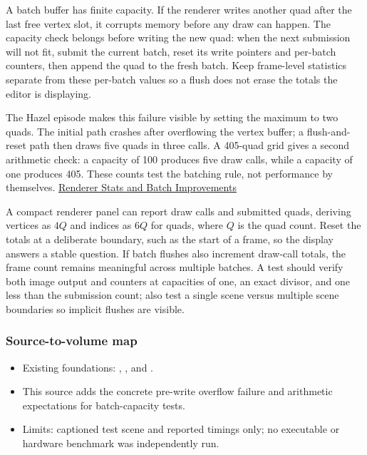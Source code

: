 \hypertarget{06-engine-ii-ch026-a-batch-limit-must-trigger-a-flush-before-the-next-quad-is-written}{}

A batch buffer has finite capacity. If the renderer writes another quad after the last free vertex slot, it corrupts memory before any draw can happen. The capacity check belongs before writing the new quad: when the next submission will not fit, submit the current batch, reset its write pointers and per-batch counters, then append the quad to the fresh batch. Keep frame-level statistics separate from these per-batch values so a flush does not erase the totals the editor is displaying.

The Hazel episode makes this failure visible by setting the maximum to two quads. The initial path crashes after overflowing the vertex buffer; a flush-and-reset path then draws five quads in three calls. A 405-quad grid gives a second arithmetic check: a capacity of 100 produces five draw calls, while a capacity of one produces 405. These counts test the batching rule, not performance by themselves. \href{https://www.youtube.com/watch?v=KKv_pZvn2rM}{Renderer Stats and Batch Improvements}

A compact renderer panel can report draw calls and submitted quads, deriving vertices as \(4Q\) and indices as \(6Q\) for quads, where \(Q\) is the quad count. Reset the totals at a deliberate boundary, such as the start of a frame, so the display answers a stable question. If batch flushes also increment draw-call totals, the frame count remains meaningful across multiple batches. A test should verify both image output and counters at capacities of one, an exact divisor, and one less than the submission count; also test a single scene versus multiple scene boundaries so implicit flushes are visible.

\subsubsection{Source-to-volume map}\label{06-engine-ii-ch026-source-to-volume-map-3}

\hypertarget{06-engine-ii-ch026-source-to-volume-map-3}{}

\begin{itemize}
\tightlist
\item
  Existing foundations: , , and .
\item
  This source adds the concrete pre-write overflow failure and arithmetic expectations for batch-capacity tests.
\item
  Limits: captioned test scene and reported timings only; no executable or hardware benchmark was independently run.
\end{itemize}

